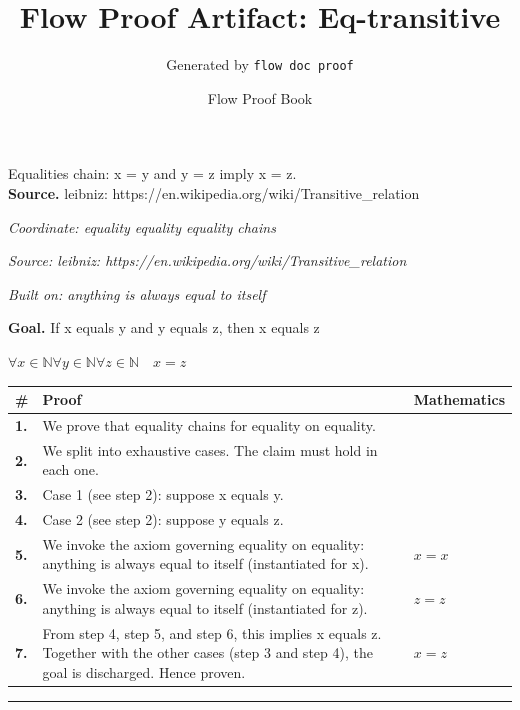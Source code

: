 \documentclass[11pt]{article}
\title{Flow Proof Artifact: Eq-transitive}
\author{Generated by \texttt{flow doc proof}}
\date{Flow Proof Book}
\theoremstyle{definition}
\begin{document}
\maketitle
Equalities chain: x = y and y = z imply x = z.\\[0.5em]
\textbf{Source.} leibniz: https://en.wikipedia.org/wiki/Transitive\_relation\\[0.5em]
\bigskip
{}\par
\smallskip\noindent\textit{Coordinate: equality \cdot equality \cdot equality chains}\par
\smallskip\noindent\textit{Source: leibniz: https://en.wikipedia.org/wiki/Transitive\_relation}\par
\smallskip\noindent\textit{Built on: anything is always equal to itself}\par
\medskip
\noindent\textbf{Goal.} If x equals y and y equals z, then x equals z\par
\noindent$\displaystyle \forall x \in \mathbb{N} \forall y \in \mathbb{N} \forall z \in \mathbb{N}\quad x = z$\par
\medskip
\noindent
\begin{tabular}{@{} >{\raggedright\arraybackslash}p{} >{\raggedright\arraybackslash}p{} >{\raggedleft\arraybackslash}p{} @{}}
\textbf{\#} & \textbf{Proof} & \textbf{Mathematics} \\
\midrule
\textbf{1.} & We prove that equality chains for equality on equality. & \\[0.45em]
\textbf{2.} & We split into exhaustive cases. The claim must hold in each one. & \\[0.45em]
\textbf{3.} & Case 1 (see step 2): suppose x  equals  y. & \\[0.45em]
\textbf{4.} & Case 2 (see step 2): suppose y  equals  z. & \\[0.45em]
\textbf{5.} & We invoke the axiom governing equality on equality: anything is always equal to itself (instantiated for x). & $\displaystyle x = x$ \\[0.45em]
\textbf{6.} & We invoke the axiom governing equality on equality: anything is always equal to itself (instantiated for z). & $\displaystyle z = z$ \\[0.45em]
\textbf{7.} & From step 4, step 5, and step 6, this implies x equals z. Together with the other cases (step 3 and step 4), the goal is discharged. Hence proven. & $\displaystyle x = z$ \\[0.45em]
\bottomrule
\end{tabular}
\label{thm:Eq-equality-equality_chains}
\par\medskip\hrule
\end{document}
